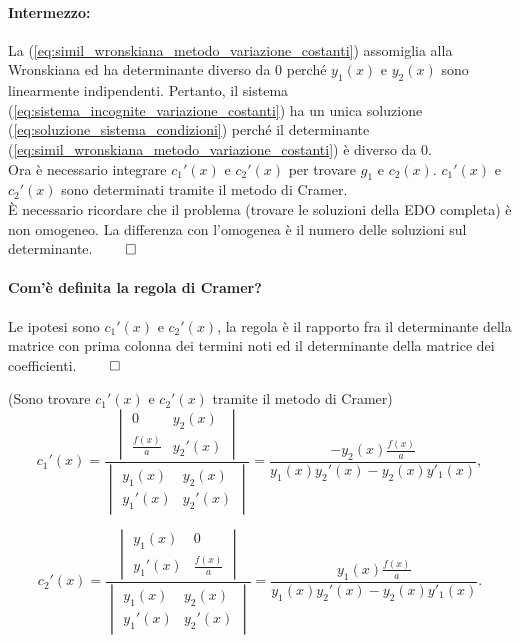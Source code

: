 \paragraph{Intermezzo:} La (\ref{eq:simil_wronskiana_metodo_variazione_costanti}) assomiglia alla Wronskiana ed ha determinante diverso da 0 perché $y_1(x)$ e $y_2(x)$ sono linearmente indipendenti. Pertanto, il sistema (\ref{eq:sistema_incognite_variazione_costanti}) ha un unica soluzione (\ref{eq:soluzione_sistema_condizioni}) perché il determinante (\ref{eq:simil_wronskiana_metodo_variazione_costanti}) è diverso da 0.\\
Ora è necessario integrare $c_1'(x)$ e $c_2'(x)$ per trovare $g_1$ e $c_2(x)$. $c_1'(x)$ e $c_2'(x)$ sono determinati tramite il metodo di Cramer.\\
È necessario ricordare che il problema (trovare le soluzioni della EDO completa) è non omogeneo. La differenza con l'omogenea è il numero delle soluzioni sul determinante. $\qed$

\paragraph{Com'è definita la regola di Cramer?} Le ipotesi sono $c_1'(x)$ e $c_2'(x)$, la regola è il rapporto fra il determinante della matrice con prima colonna dei termini noti ed il determinante della matrice dei coefficienti. $\qed$

\noindent (Sono trovare $c_1'(x)$ e $c_2'(x)$ tramite il metodo di Cramer)
\begin{equation*}
	c_1'(x)=\frac{
	\begin{vmatrix}
		0 & y_2(x)\\
		\frac{f(x)}{a} & y_2'(x)
	\end{vmatrix}
	}{
	\begin{vmatrix}
		y_1(x) & y_2(x)\\
		y_1'(x) & y_2'(x)
	\end{vmatrix}
	} = \frac{-y_2(x)\frac{f(x)}{a}}{y_1(x)y_2'(x) - y_2(x) y'_1(x)},
\end{equation*}

\begin{equation*}
	c_2'(x)=\frac{
		\begin{vmatrix}
			y_1(x) & 0\\
			 y_1'(x) & \frac{f(x)}{a}
		\end{vmatrix}
	}{
		\begin{vmatrix}
			y_1(x) & y_2(x)\\
			y_1'(x) & y_2'(x)
		\end{vmatrix}
	} = \frac{y_1(x)\frac{f(x)}{a}}{y_1(x)y_2'(x) - y_2(x) y'_1(x)}.
\end{equation*}

